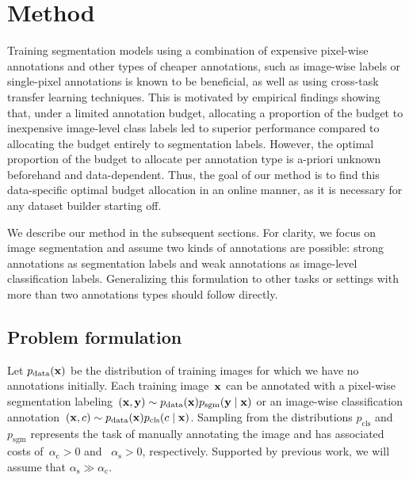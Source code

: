 \section{Method}
\label{sec:fullweak_method}

Training segmentation models using a combination of expensive pixel-wise annotations and other types of cheaper annotations, such as image-wise labels or single-pixel annotations is known to be beneficial, as well as using cross-task transfer learning techniques. This is motivated by empirical findings showing that, under a limited annotation budget, allocating a proportion of the budget to inexpensive image-level class labels led to superior performance compared to allocating the budget entirely to segmentation labels. However, the optimal proportion of the budget to allocate per annotation type is a-priori unknown beforehand and data-dependent. Thus, the goal of our method is to find this data-specific optimal budget allocation in an online manner, as it is necessary for any dataset builder starting off.

We describe our method in the subsequent sections. For clarity, we focus on image segmentation and assume two kinds of annotations are possible: strong annotations as segmentation labels and weak annotations as image-level classification labels. Generalizing this formulation to other tasks or settings with more than two annotations types should follow directly.

\subsection{Problem formulation} 
Let $p_\textrm{data}(\mathbf{x})$ be the distribution of training images for which we have no annotations initially. Each training image~$\mathbf{x}$ can be annotated with a pixel-wise segmentation labeling~{$(\mathbf{x},\mathbf{y})\sim{}p_\textrm{data}(\mathbf{x})p_\textrm{sgm}(\mathbf{y}\mid\mathbf{x})$} or an image-wise classification annotation~{$(\mathbf{x},c)\sim{}p_\textrm{data}(\mathbf{x})p_\textrm{cls}(c\mid\mathbf{x})$}. 
Sampling from the distributions $p_\textrm{cls}$ and~$p_\textrm{sgm}$ represents the task of manually annotating the image and has associated costs of~$\alpha_\textrm{c}>0$ and ~$\alpha_\textrm{s}>0$, respectively. Supported by previous work, we will assume that $\alpha_\textrm{s}\gg\alpha_\textrm{c}$.

